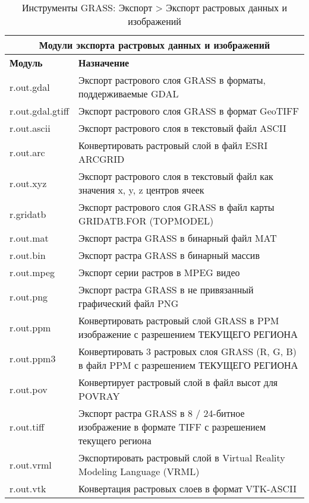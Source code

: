 {\renewcommand{\arraystretch}{0.7}
\begin{table}[H]
\centering
 \begin{tabular}{|p{4cm}|p{11cm}|}
  \hline \multicolumn{2}{|c|}{\textbf{Модули экспорта растровых данных
  и изображений}} \\
  \hline \textbf{Модуль} & \textbf{Назначение} \\
  \hline r.out.gdal & Экспорт растрового слоя GRASS в форматы,
  поддерживаемые GDAL \\
  \hline r.out.gdal.gtiff & Экспорт растрового слоя GRASS в формат GeoTIFF \\
  \hline r.out.ascii & Экспорт растрового слоя в текстовый файл ASCII \\
  \hline r.out.arc & Конвертировать растровый слой в файл ESRI ARCGRID \\
  \hline r.out.xyz & Экспорт растрового слоя в текстовый файл как значения
  x, y, z центров ячеек \\
  \hline r.gridatb & Экспорт растрового слоя GRASS в файл карты GRIDATB.FOR
  (TOPMODEL) \\
  \hline r.out.mat & Экспорт растра GRASS в бинарный файл MAT \\
  \hline r.out.bin & Экспорт растра GRASS в бинарный массив \\
  \hline r.out.mpeg & Экспорт серии растров в MPEG видео \\
  \hline r.out.png & Экспорт растра GRASS в не привязанный графический
  файл PNG \\
  \hline r.out.ppm & Конвертировать растровый слой GRASS в PPM
  изображение с разрешением ТЕКУЩЕГО РЕГИОНА \\
  \hline r.out.ppm3 & Конвертировать 3 растровых слоя GRASS (R, G, B) в
  файл PPM с разрешением ТЕКУЩЕГО РЕГИОНА \\
  \hline r.out.pov & Конвертирует растровый слой в файл высот для POVRAY \\
  \hline r.out.tiff & Экспорт растра GRASS в 8 / 24-битное изображение в
  формате TIFF с разрешением текущего региона \\
  \hline r.out.vrml & Экспортировать растровый слой в Virtual Reality
  Modeling Language (VRML) \\
  \hline r.out.vtk & Конвертация растровых слоев в формат VTK-ASCII \\
\hline
\end{tabular}
\caption{Инструменты GRASS: Экспорт > Экспорт растровых данных и изображений}
\end{table}}


